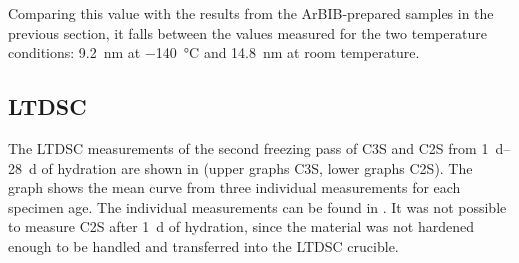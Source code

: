 Comparing this value with the results from the \ac{ArBIB}-prepared samples in the previous section, it falls between the values measured for the two temperature conditions: \qty{9.2}{\nano\meter} at \qty{-140}{\celsius} and \qty{14.8}{\nano\meter} at room temperature.




\FloatBarrier
\subsection{\acs{LTDSC}}

The \ac{LTDSC} measurements of the second freezing pass of \ac{C3S} and \ac{C2S} from \qtyrange{1}{28}{\day} of hydration are shown in  (upper graphs \ac{C3S}, lower graphs \ac{C2S}).
The graph shows the mean curve from three individual measurements for each specimen age.
The individual measurements can be found in .
It was not possible to measure \ac{C2S} after \qty{1}{\day} of hydration, since the material was not hardened enough to be handled and transferred into the \ac{LTDSC} crucible.

